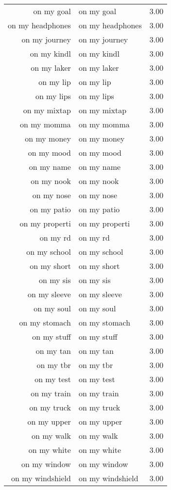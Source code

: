 \begin{table}[ht]
\begin{tabular}{rlr}
  on my goal & on my goal & 3.00 \\ 
  on my headphones & on my headphones & 3.00 \\ 
  on my journey & on my journey & 3.00 \\ 
  on my kindl & on my kindl & 3.00 \\ 
  on my laker & on my laker & 3.00 \\ 
  on my lip & on my lip & 3.00 \\ 
  on my lips & on my lips & 3.00 \\ 
  on my mixtap & on my mixtap & 3.00 \\ 
  on my momma & on my momma & 3.00 \\ 
  on my money & on my money & 3.00 \\ 
  on my mood & on my mood & 3.00 \\ 
  on my name & on my name & 3.00 \\ 
  on my nook & on my nook & 3.00 \\ 
  on my nose & on my nose & 3.00 \\ 
  on my patio & on my patio & 3.00 \\ 
  on my properti & on my properti & 3.00 \\ 
  on my rd & on my rd & 3.00 \\ 
  on my school & on my school & 3.00 \\ 
  on my short & on my short & 3.00 \\ 
  on my sis & on my sis & 3.00 \\ 
  on my sleeve & on my sleeve & 3.00 \\ 
  on my soul & on my soul & 3.00 \\ 
  on my stomach & on my stomach & 3.00 \\ 
  on my stuff & on my stuff & 3.00 \\ 
  on my tan & on my tan & 3.00 \\ 
  on my tbr & on my tbr & 3.00 \\ 
  on my test & on my test & 3.00 \\ 
  on my train & on my train & 3.00 \\ 
  on my truck & on my truck & 3.00 \\ 
  on my upper & on my upper & 3.00 \\ 
  on my walk & on my walk & 3.00 \\ 
  on my white & on my white & 3.00 \\ 
  on my window & on my window & 3.00 \\ 
  on my windshield & on my windshield & 3.00 \\ 

\end{tabular}
\end{table}
